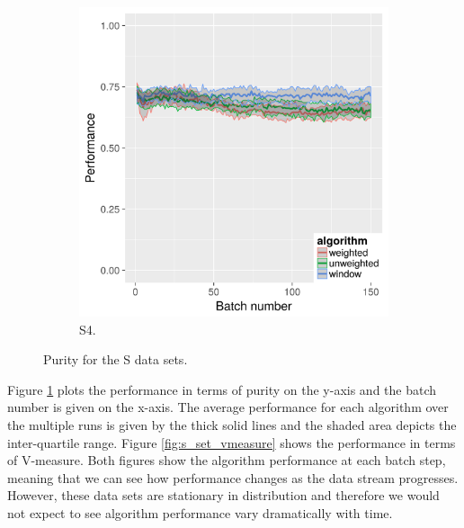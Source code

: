 \begin{figure}[H]
\begin{subfigure}{.45\textwidth}
  \centering
  \includegraphics[width=.9\linewidth]{s_set/s_set_4_with_weighted_ci_one_size_purity.png}
  \caption{S4.}
\end{subfigure}
\caption{Purity for the S data sets.}
\label{fig:s_set_purity}
\end{figure}

Figure \ref{fig:s_set_purity} plots the performance in terms of purity on the y-axis and the batch number is given on the x-axis. The average performance for each algorithm over the multiple runs is given by the thick solid lines and the shaded area depicts the inter-quartile range.  Figure \ref{fig:s_set_vmeasure} shows the performance in terms of V-measure.  Both figures show the algorithm performance at each batch step, meaning that we can see how performance changes as the data stream progresses. However, these data sets are stationary in distribution and therefore we would not expect to see algorithm performance vary dramatically with time. 

